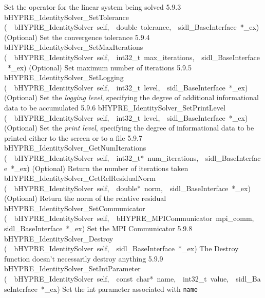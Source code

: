 \documentclass{article}
\begin{document}
\begin{cxxentry}
\begin{cxxentry}
\begin{cxxnames}
        {
Set the operator for the linear system being solved}
        {5.9.3}
        {bHYPRE\_IdentitySolver\_SetTolerance}
        {(\ \ bHYPRE\_IdentitySolver\ self,\ \ double\ tolerance,\ \ sidl\_BaseInterface\ *\_ex)}
        {
(Optional) Set the convergence tolerance}
        {5.9.4}
        {bHYPRE\_IdentitySolver\_SetMaxIterations}
        {(\ \ bHYPRE\_IdentitySolver\ self,\ \ int32\_t\ max\_iterations,\ \ sidl\_BaseInterface\ *\_ex)}
        {
(Optional) Set maximum number of iterations}
        {5.9.5}
        {bHYPRE\_IdentitySolver\_SetLogging}
        {(\ \ bHYPRE\_IdentitySolver\ self,\ \ int32\_t\ level,\ \ sidl\_BaseInterface\ *\_ex)}
        {
(Optional) Set the {\it logging level}, specifying the degree
of additional informational data to be accumulated}
        {5.9.6}
        {bHYPRE\_IdentitySolver\_SetPrintLevel}
        {(\ \ bHYPRE\_IdentitySolver\ self,\ \ int32\_t\ level,\ \ sidl\_BaseInterface\ *\_ex)}
        {
(Optional) Set the {\it print level}, specifying the degree
of informational data to be printed either to the screen or
to a file}
        {5.9.7}
        {bHYPRE\_IdentitySolver\_GetNumIterations}
        {(\ \ bHYPRE\_IdentitySolver\ self,\ \ int32\_t*\ num\_iterations,\ \ sidl\_BaseInterface\ *\_ex)}
        {
(Optional) Return the number of iterations taken}
        {}
\label{cxx.5.9.15}
        {bHYPRE\_IdentitySolver\_GetRelResidualNorm}
        {(\ \ bHYPRE\_IdentitySolver\ self,\ \ double*\ norm,\ \ sidl\_BaseInterface\ *\_ex)}
        {
(Optional) Return the norm of the relative residual}
        {}
\label{cxx.5.9.16}
        {bHYPRE\_IdentitySolver\_SetCommunicator}
        {(\ \ bHYPRE\_IdentitySolver\ self,\ \ bHYPRE\_MPICommunicator\ mpi\_comm,\ \ sidl\_BaseInterface\ *\_ex)}
        {
Set the MPI Communicator}
        {5.9.8}
        {bHYPRE\_IdentitySolver\_Destroy}
        {(\ \ bHYPRE\_IdentitySolver\ self,\ \ sidl\_BaseInterface\ *\_ex)}
        {
The Destroy function doesn't necessarily destroy anything}
        {5.9.9}
        {bHYPRE\_IdentitySolver\_SetIntParameter}
        {(\ \ bHYPRE\_IdentitySolver\ self,\ \ const\ char*\ name,\ \ int32\_t\ value,\ \ sidl\_BaseInterface\ *\_ex)}
        {
Set the int parameter associated with {\tt name}}

\end{cxxnames}
\end{cxxentry}
\end{cxxentry}
\end{document}
